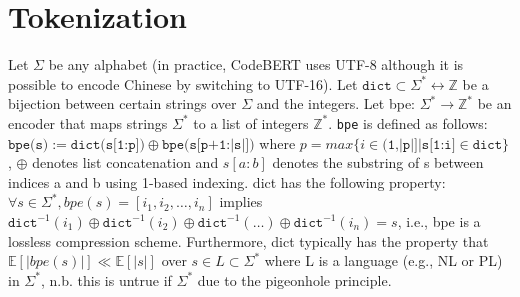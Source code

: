 \documentclass[usenames,dvipsnames]{article} %
\begin{document}
  \section{Tokenization}
  Let $\Sigma$ be any alphabet (in practice, CodeBERT uses UTF-8 although it is possible to encode Chinese by switching to UTF-16).
  Let $\texttt{dict} \subset \Sigma^*\leftrightarrow\mathbb Z$ be a bijection between certain strings over $\Sigma$ and the integers.
  Let bpe: $\Sigma^*\rightarrow\mathbb{Z}^*$ be an encoder that maps strings $\Sigma^*$ to a list of integers $\mathbb{Z}^*$.
  \texttt{bpe} is defined as follows: $\texttt{bpe(s)} := \texttt{dict(s[1:p])} \oplus \texttt{bpe(s[p+1:|s|])}$ where $p = max \{ i \in \texttt{(1,|p|]} | \texttt{s[1:i]} \in \texttt{dict} \}$, $\oplus$ denotes list concatenation and $s[a:b]$ denotes the substring of s between indices a and b using 1-based indexing.
  dict has the following property: $\forall s \in \Sigma^*, bpe(s) = [i_1, i_2, \ldots, i_n]$ implies $\texttt{dict}^{-1}(i_1) \oplus \texttt{dict}^{-1}(i_2) \oplus \texttt{dict}^{-1}(\ldots) \oplus \texttt{dict}^{-1}(i_n) = s$, i.e., bpe is a lossless compression scheme.
  Furthermore, dict typically has the property that $\mathbb{E}[|bpe(s)|] \ll \mathbb{E}[|s|]$ over $s \in L \subset \Sigma^*$ where L is a language (e.g., NL or PL) in $\Sigma^*$, n.b. this is untrue if $\Sigma^*$ due to the pigeonhole principle.
\end{document}
